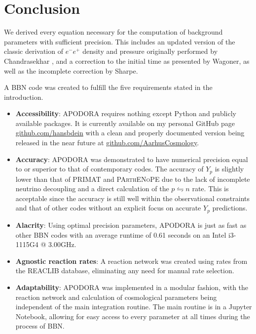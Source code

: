 








\chapter{Conclusion}
\label{chap:Conclusion}

We derived every equation necessary for the computation of background parameters with sufficient precision. This includes an updated version of the classic derivation of $e^{-}e^{+}$ density and pressure originally performed by Chandrasekhar \cite{Chandrasekhar}, and a correction to the initial time as presented by Wagoner\cite{Wagoner67}, as well as the incomplete correction by Sharpe\cite{sharpe2021big}. 

\noindent A BBN code was created to fulfill the five requirements stated in the introduction.
\begin{itemize}
    \item \textbf{Accessibility}: APODORA requires nothing except Python and publicly available packages. It is currently available on my personal GitHub page \url{github.com/hansbdein} with a clean and properly documented version being released in the near future at \url{github.com/AarhusCosmology}.
    \item \textbf{Accuracy}: APODORA was demonstrated to have numerical precision equal to or superior to that of contemporary codes. The accuracy of $Y_p$ is slightly lower than that of PRIMAT and \textsc{PArthENoPE} due to the lack of incomplete neutrino decoupling and a direct calculation of the $p\leftrightharpoons n$ rate. This is acceptable since the accuracy is still well within the observational constraints and that of other codes without an explicit focus on accurate $Y_p$ predictions.
    \item \textbf{Alacrity}: Using optimal precision parameters, APODORA is just as fast as other BBN codes with an average runtime of 0.61 seconds on an Intel i3-1115G4 @ 3.00GHz.
    \item \textbf{Agnostic reaction rates}: A reaction network was created using rates from the REACLIB database\cite{REACLIB}, eliminating any need for manual rate selection.
    \item \textbf{Adaptability}: APODORA was implemented in a modular fashion, with the reaction network and calculation of cosmological parameters being independent of the main integration routine. The main routine is in a Jupyter Notebook, allowing for easy access to every parameter at all times during the process of BBN. 
\end{itemize}




